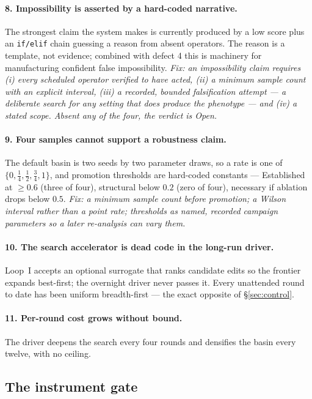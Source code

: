 \documentclass[11pt]{article}
\newcommand{\code}[1]{\texttt{#1}}
\begin{document}
\paragraph{8. \textcolor{cop}{Impossibility is asserted by a hard-coded narrative.}} The strongest
claim the system makes is currently produced by a low score plus an \code{if/elif} chain guessing
a reason from absent operators. The reason is a template, not evidence; combined with defect 4
this is machinery for manufacturing confident false impossibility. \emph{Fix: an impossibility
claim requires (i) every scheduled operator verified to have acted, (ii) a minimum sample count
with an explicit interval, (iii) a recorded, bounded falsification attempt --- a deliberate search
for any setting that does produce the phenotype --- and (iv) a stated scope. Absent any of the
four, the verdict is Open.}

\paragraph{9. \textcolor{cop}{Four samples cannot support a robustness claim.}} The default basin
is two seeds by two parameter draws, so a rate is one of $\{0,\frac14,\frac12,\frac34,1\}$, and
promotion thresholds are hard-coded constants --- Established at $\ge0.6$ (three of four),
structural below $0.2$ (zero of four), necessary if ablation drops below $0.5$. \emph{Fix: a
minimum sample count before promotion; a Wilson interval rather than a point rate; thresholds as
named, recorded campaign parameters so a later re-analysis can vary them.}

\paragraph{10. The search accelerator is dead code in the long-run driver.} Loop~I accepts an
optional surrogate that ranks candidate edits so the frontier expands best-first; the overnight
driver never passes it. Every unattended round to date has been uniform breadth-first --- the exact
opposite of \S\ref{sec:control}.

\paragraph{11. Per-round cost grows without bound.} The driver deepens the search every four
rounds and densifies the basin every twelve, with no ceiling.

\subsection*{The instrument gate}
\end{document}
